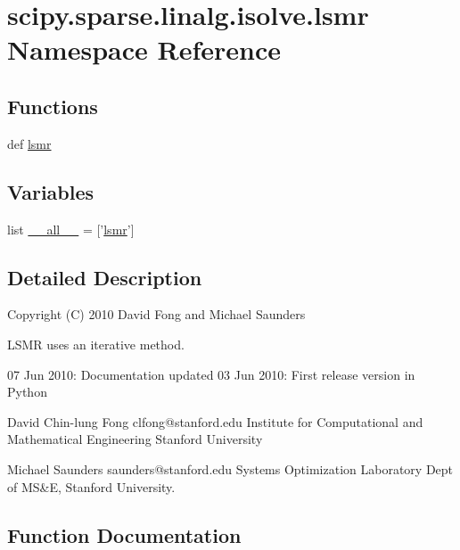 \hypertarget{namespacescipy_1_1sparse_1_1linalg_1_1isolve_1_1lsmr}{}\section{scipy.\+sparse.\+linalg.\+isolve.\+lsmr Namespace Reference}
\label{namespacescipy_1_1sparse_1_1linalg_1_1isolve_1_1lsmr}
\subsection*{Functions}
\begin{DoxyCompactItemize}
\item 
def \hyperlink{namespacescipy_1_1sparse_1_1linalg_1_1isolve_1_1lsmr_a57daf539f1633d89f4f9671f859bf5a8}{lsmr}
\end{DoxyCompactItemize}
\subsection*{Variables}
\begin{DoxyCompactItemize}
\item 
list \hyperlink{namespacescipy_1_1sparse_1_1linalg_1_1isolve_1_1lsmr_acfd14ff3ed99383cee3b3455837a4ad4}{\+\_\+\+\_\+all\+\_\+\+\_\+} = \mbox{[}'\hyperlink{namespacescipy_1_1sparse_1_1linalg_1_1isolve_1_1lsmr_a57daf539f1633d89f4f9671f859bf5a8}{lsmr}'\mbox{]}
\end{DoxyCompactItemize}


\subsection{Detailed Description}
\begin{DoxyVerb}Copyright (C) 2010 David Fong and Michael Saunders

LSMR uses an iterative method.

07 Jun 2010: Documentation updated
03 Jun 2010: First release version in Python

David Chin-lung Fong            clfong@stanford.edu
Institute for Computational and Mathematical Engineering
Stanford University

Michael Saunders                saunders@stanford.edu
Systems Optimization Laboratory
Dept of MS&E, Stanford University.\end{DoxyVerb}
 

\subsection{Function Documentation}
\hypertarget{namespacescipy_1_1sparse_1_1linalg_1_1isolve_1_1lsmr_a57daf539f1633d89f4f9671f859bf5a8}{}
